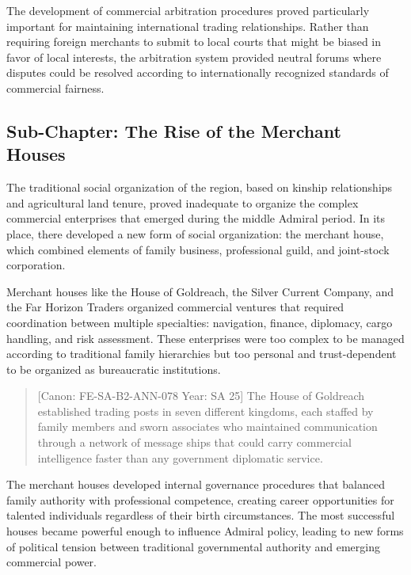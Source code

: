 The development of commercial arbitration procedures proved particularly
important for maintaining international trading relationships. Rather
than requiring foreign merchants to submit to local courts that might be
biased in favor of local interests, the arbitration system provided
neutral forums where disputes could be resolved according to
internationally recognized standards of commercial fairness.

\subsection{Sub-Chapter: The Rise of the Merchant
Houses}\label{sub-chapter-the-rise-of-the-merchant-houses}

The traditional social organization of the region, based on kinship
relationships and agricultural land tenure, proved inadequate to
organize the complex commercial enterprises that emerged during the
middle Admiral period. In its place, there developed a new form of
social organization: the merchant house, which combined elements of
family business, professional guild, and joint-stock corporation.

Merchant houses like the House of Goldreach, the Silver Current Company,
and the Far Horizon Traders organized commercial ventures that required
coordination between multiple specialties: navigation, finance,
diplomacy, cargo handling, and risk assessment. These enterprises were
too complex to be managed according to traditional family hierarchies
but too personal and trust-dependent to be organized as bureaucratic
institutions.

\begin{quote}
{[}Canon: FE-SA-B2-ANN-078 \textbar{} Year: SA 25{]} The House of
Goldreach established trading posts in seven different kingdoms, each
staffed by family members and sworn associates who maintained
communication through a network of message ships that could carry
commercial intelligence faster than any government diplomatic service.
\end{quote}

The merchant houses developed internal governance procedures that
balanced family authority with professional competence, creating career
opportunities for talented individuals regardless of their birth
circumstances. The most successful houses became powerful enough to
influence Admiral policy, leading to new forms of political tension
between traditional governmental authority and emerging commercial
power.

